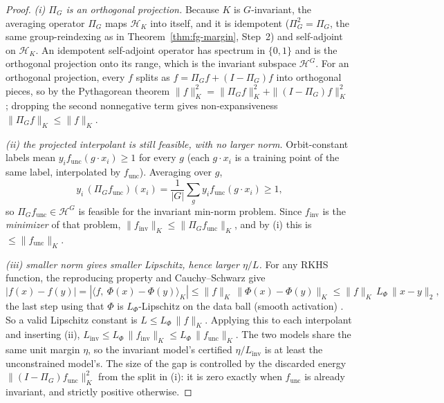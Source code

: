 \begin{proof}
\emph{(i) $\Pi_G$ is an orthogonal projection.}
Because $K$ is $G$-invariant, the averaging operator $\Pi_G$ maps $\mathcal H_K$ into itself, and it
is idempotent ($\Pi_G^2 = \Pi_G$, the same group-reindexing as in Theorem~\ref{thm:fg-margin}, Step~2)
and self-adjoint on $\mathcal H_K$. An idempotent self-adjoint operator has spectrum in $\{0,1\}$ and
is the orthogonal projection onto its range, which is the invariant subspace $\mathcal H^G$. For an
orthogonal projection, every $f$ splits as $f = \Pi_G f + (I-\Pi_G)f$ into orthogonal pieces, so by
the Pythagorean theorem $\|f\|_K^2 = \|\Pi_G f\|_K^2 + \|(I-\Pi_G)f\|_K^2$
\citep{elesedy2021}; dropping the second nonnegative term gives non-expansiveness
$\|\Pi_G f\|_K \le \|f\|_K$.

\emph{(ii) the projected interpolant is still feasible, with no larger norm.}
Orbit-constant labels mean $y_i f_{\mathrm{unc}}(g\cdot x_i) \ge 1$ for every $g$ (each $g\cdot x_i$
is a training point of the same label, interpolated by $f_{\mathrm{unc}}$). Averaging over $g$,
\[
y_i\,(\Pi_G f_{\mathrm{unc}})(x_i) = \frac1{|G|}\sum_g y_i f_{\mathrm{unc}}(g\cdot x_i) \ge 1,
\]
so $\Pi_G f_{\mathrm{unc}} \in \mathcal H^G$ is feasible for the invariant min-norm problem. Since
$f_{\mathrm{inv}}$ is the \emph{minimizer} of that problem, $\|f_{\mathrm{inv}}\|_K \le
\|\Pi_G f_{\mathrm{unc}}\|_K$, and by (i) this is $\le \|f_{\mathrm{unc}}\|_K$.

\emph{(iii) smaller norm gives smaller Lipschitz, hence larger $\eta/L$.}
For any RKHS function, the reproducing property and Cauchy--Schwarz give
\[
|f(x) - f(y)| = |\langle f,\ \Phi(x) - \Phi(y)\rangle_K|
\le \|f\|_K\,\|\Phi(x) - \Phi(y)\|_K
\le \|f\|_K\,L_\Phi\,\|x - y\|_2,
\]
the last step using that $\Phi$ is $L_\Phi$-Lipschitz on the data ball (smooth activation)
\citep{biettimairal2019}. So a valid Lipschitz constant is $L \le L_\Phi\,\|f\|_K$. Applying this to
each interpolant and inserting (ii), $L_{\mathrm{inv}} \le L_\Phi\,\|f_{\mathrm{inv}}\|_K \le
L_\Phi\,\|f_{\mathrm{unc}}\|_K$. The two models share the same unit margin $\eta$, so the invariant
model's certified $\eta/L_{\mathrm{inv}}$ is at least the unconstrained model's. The size of the gap is
controlled by the discarded energy $\|(I-\Pi_G)f_{\mathrm{unc}}\|_K^2$ from the split in (i): it is
zero exactly when $f_{\mathrm{unc}}$ is already invariant, and strictly positive otherwise.
\end{proof}

